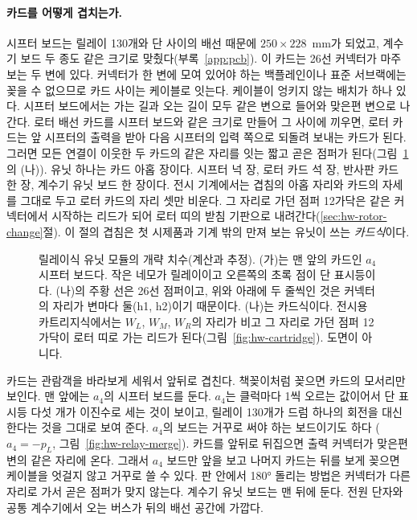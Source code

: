 \paragraph{카드를 어떻게 겹치는가.} 시프터 보드는 릴레이 130개와 단 사이의 배선 때문에 $250 \times 228$~mm가
되었고, 계수기 보드 두 종도 같은 크기로 맞췄다(부록~\ref{app:pcb}). 이 카드는 26선 커넥터가 마주 보는 두 변에
있다. 커넥터가 한 변에 모여 있어야 하는 백플레인이나 표준 서브랙에는 꽂을 수 없으므로 카드 사이는 케이블로
잇는다. 케이블이 엉키지 않는 배치가 하나 있다. 시프터 보드에서는 가는 길과 오는 길이 모두 같은 변으로 들어와
맞은편 변으로 나간다. 로터 배선 카드를 시프터 보드와 같은 크기로 만들어 그 사이에 끼우면, 로터 카드는 앞
시프터의 출력을 받아 다음 시프터의 입력 쪽으로 되돌려 보내는 카드가 된다. 그러면 모든 연결이 이웃한 두 카드의
같은 자리를 잇는 짧고 곧은 점퍼가 된다(그림~\ref{fig:hw-relay-dim-unit}의 (나)). 유닛 하나는 카드 아홉 장이다.
시프터 넉 장, 로터 카드 석 장, 반사판 카드 한 장, 계수기 유닛 보드 한 장이다. 전시 기계에서는 겹침의 아홉 자리와
카드의 자세를 그대로 두고 로터 카드의 자리 셋만 비운다. 그 자리로 가던 점퍼 12가닥은 같은 커넥터에서 시작하는
리드가 되어 로터 띠의 받침 기판으로 내려간다(\ref{sec:hw-rotor-change}절). 이 절의 겹침은 첫 시제품과 기계 밖의
만져 보는 유닛이 쓰는 \emph{카드식}이다.

\begin{figure}[ht]
\centering

\caption{릴레이식 유닛 모듈의 개략 치수(계산과 추정). (가)는 맨 앞의 카드인 $a_4$ 시프터 보드다. 작은 네모가
릴레이이고 오른쪽의 초록 점이 단 표시등이다. (나)의 주황 선은 26선 점퍼이고, 위와 아래에 두 줄씩인 것은 커넥터의
자리가 변마다 둘(h1, h2)이기 때문이다. (나)는 카드식이다. 전시용 카트리지식에서는 $W_L$, $W_M$, $W_R$의 자리가 비고
그 자리로 가던 점퍼 12가닥이 로터 띠로 가는 리드가 된다(그림~\ref{fig:hw-cartridge}). 도면이 아니다.}
\label{fig:hw-relay-dim-unit}
\end{figure}

카드는 관람객을 바라보게 세워서 앞뒤로 겹친다. 책꽂이처럼 꽂으면 카드의 모서리만 보인다. 맨 앞에는 $a_4$의
시프터 보드를 둔다. $a_4$는 클럭마다 1씩 오르는 값이어서 단 표시등 다섯 개가 이진수로 세는 것이 보이고, 릴레이
130개가 드럼 하나의 회전을 대신한다는 것을 그대로 보여 준다. $a_4$의 보드는 거꾸로 써야 하는 보드이기도 하다
($a_4 = -p_L$, 그림~\ref{fig:hw-relay-merge}). 카드를 앞뒤로 뒤집으면 출력 커넥터가 맞은편 변의 같은 자리에 온다. 그래서
$a_4$ 보드만 앞을 보고 나머지 카드는 뒤를 보게 꽂으면 케이블을 엇걸지 않고 거꾸로 쓸 수 있다. 판 안에서 180°
돌리는 방법은 커넥터가 다른 자리로 가서 곧은 점퍼가 맞지 않는다. 계수기 유닛 보드는 맨 뒤에 둔다. 전원 단자와
공통 계수기에서 오는 버스가 뒤의 배선 공간에 가깝다.

